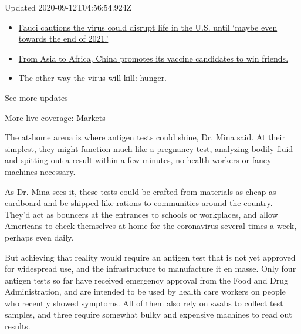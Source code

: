 Updated 2020-09-12T04:56:54.924Z

\begin{itemize}
\tightlist
\item
  \href{https://www.nytimes3xbfgragh.onion/2020/09/11/world/covid-19-coronavirus.html?action=click\&pgtype=Article\&state=default\&region=MAIN_CONTENT_1\&context=storylines_live_updates\#link-dfb8a16}{Fauci
  cautions the virus could disrupt life in the U.S. until `maybe even
  towards the end of 2021.'}
\item
  \href{https://www.nytimes3xbfgragh.onion/2020/09/11/world/covid-19-coronavirus.html?action=click\&pgtype=Article\&state=default\&region=MAIN_CONTENT_1\&context=storylines_live_updates\#link-7104d154}{From
  Asia to Africa, China promotes its vaccine candidates to win friends.}
\item
  \href{https://www.nytimes3xbfgragh.onion/2020/09/11/world/covid-19-coronavirus.html?action=click\&pgtype=Article\&state=default\&region=MAIN_CONTENT_1\&context=storylines_live_updates\#link-393ad215}{The
  other way the virus will kill: hunger.}
\end{itemize}

\href{https://www.nytimes3xbfgragh.onion/2020/09/11/world/covid-19-coronavirus.html?action=click\&pgtype=Article\&state=default\&region=MAIN_CONTENT_1\&context=storylines_live_updates}{See
more updates}

More live coverage:
\href{https://www.nytimes3xbfgragh.onion/live/2020/09/11/business/stock-market-today-coronavirus?action=click\&pgtype=Article\&state=default\&region=MAIN_CONTENT_1\&context=storylines_live_updates}{Markets}

The at-home arena is where antigen tests could shine, Dr. Mina said. At
their simplest, they might function much like a pregnancy test,
analyzing bodily fluid and spitting out a result within a few minutes,
no health workers or fancy machines necessary.

As Dr. Mina sees it, these tests could be crafted from materials as
cheap as cardboard and be shipped like rations to communities around the
country. They'd act as bouncers at the entrances to schools or
workplaces, and allow Americans to check themselves at home for the
coronavirus several times a week, perhaps even daily.

But achieving that reality would require an antigen test that is not yet
approved for widespread use, and the infrastructure to manufacture it en
masse. Only four antigen tests so far have received emergency approval
from the Food and Drug Administration, and are intended to be used by
health care workers on people who recently showed symptoms. All of them
also rely on swabs to collect test samples, and three require somewhat
bulky and expensive machines to read out results.

